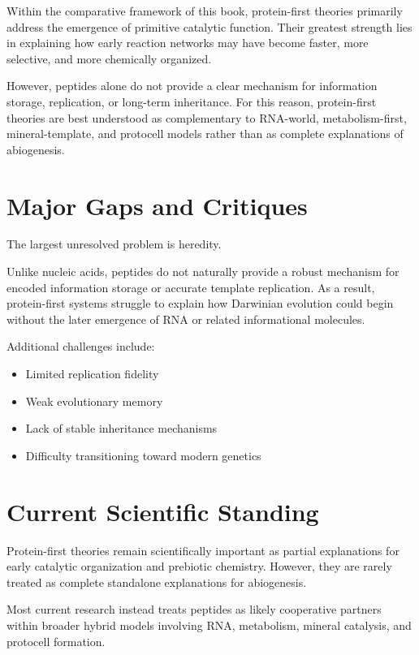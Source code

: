 \documentclass[
  oneside]{book}
\providecommand{\tightlist}{%
  \setlength{\itemsep}{0pt}\setlength{\parskip}{0pt}}
\begin{document}
Within the comparative framework of this book, protein-first theories primarily address the emergence of primitive catalytic function. Their greatest strength lies in explaining how early reaction networks may have become faster, more selective, and more chemically organized.

However, peptides alone do not provide a clear mechanism for information storage, replication, or long-term inheritance. For this reason, protein-first theories are best understood as complementary to RNA-world, metabolism-first, mineral-template, and protocell models rather than as complete explanations of abiogenesis.

\section{Major Gaps and Critiques}\label{major-gaps-and-critiques-6}

The largest unresolved problem is heredity.

Unlike nucleic acids, peptides do not naturally provide a robust mechanism for encoded information storage or accurate template replication. As a result, protein-first systems struggle to explain how Darwinian evolution could begin without the later emergence of RNA or related informational molecules.

Additional challenges include:

\begin{itemize}
\tightlist
\item
  Limited replication fidelity
\item
  Weak evolutionary memory
\item
  Lack of stable inheritance mechanisms
\item
  Difficulty transitioning toward modern genetics
\end{itemize}

\section{Current Scientific Standing}\label{current-scientific-standing-6}

Protein-first theories remain scientifically important as partial explanations for early catalytic organization and prebiotic chemistry. However, they are rarely treated as complete standalone explanations for abiogenesis.

Most current research instead treats peptides as likely cooperative partners within broader hybrid models involving RNA, metabolism, mineral catalysis, and protocell formation.
\end{document}
